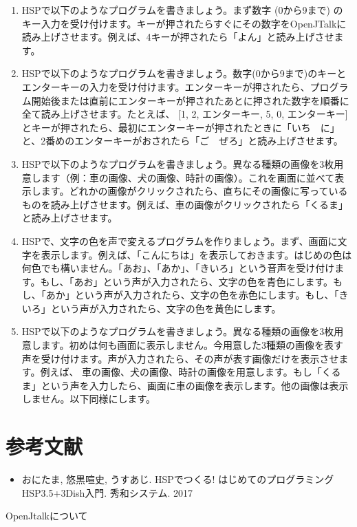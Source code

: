 \documentclass[a4paper,dvipdfmx]{jarticle}
\newcommand\liststyleLxvii{%
\renewcommand\theenumi{\arabic{enumi}}
\renewcommand\theenumii{\arabic{enumii}}
\renewcommand\theenumiii{\arabic{enumiii}}
\renewcommand\theenumiv{\arabic{enumiv}}
\renewcommand\labelenumi{\theenumi.}
\renewcommand\labelenumii{\theenumii.}
\renewcommand\labelenumiii{\theenumiii.}
\renewcommand\labelenumiv{\theenumiv.}
}
\newcommand\liststyleLxviii{%
\renewcommand\labelitemi{{\textbullet}}
\renewcommand\labelitemii{${\circ}$}
\renewcommand\labelitemiii{${\blacksquare}$}
\renewcommand\labelitemiv{{\textbullet}}
}
\begin{document}
\liststyleLxvii
\begin{enumerate}
\item {
HSPで以下のようなプログラムを書きましょう。まず数字
(0から9まで)
のキー入力を受け付けます。キーが押されたらすぐにその数字をOpenJTalkに読み上げさせます。例えば、4キーが押されたら「よん」と読み上げさせます。}
\item {
HSPで以下のようなプログラムを書きましょう。数字(0から9まで)のキーとエンターキーの入力を受け付けます。エンターキーが押されたら、プログラム開始後または直前にエンターキーが押されたあとに押された数字を順番に全て読み上げさせます。たとえば、
[1, 2, エンターキー, 5, 0,
エンターキー]とキーが押されたら、最初にエンターキーが押されたときに「いち　に」と、2番めのエンターキーがおされたら「ご　ぜろ」と読み上げさせます。}
\item {
HSPで以下のようなプログラムを書きましょう。異なる種類の画像を3枚用意します（例：車の画像、犬の画像、時計の画像）。これを画面に並べて表示します。どれかの画像がクリックされたら、直ちにその画像に写っているものを読み上げさせます。例えば、車の画像がクリックされたら「くるま」と読み上げさせます。}
\item {
HSPで、文字の色を声で変えるプログラムを作りましょう。まず、画面に文字を表示します。例えば、「こんにちは」を表示しておきます。はじめの色は何色でも構いません。「あお」、「あか」、「きいろ」という音声を受け付けます。もし、「あお」という声が入力されたら、文字の色を青色にします。もし、「あか」という声が入力されたら、文字の色を赤色にします。もし、「きいろ」という声が入力されたら、文字の色を黄色にします。}
\item {
HSPで以下のようなプログラムを書きましょう。異なる種類の画像を3枚用意します。初めは何も画面に表示しません。今用意した3種類の画像を表す声を受け付けます。声が入力されたら、その声が表す画像だけを表示させます。例えば、
車の画像、犬の画像、時計の画像を用意します。もし「くるま」という声を入力したら、画面に車の画像を表示します。他の画像は表示しません。以下同様にします。}
\end{enumerate}
\section{参考文献}
\liststyleLxviii
\begin{itemize}
\item {
おにたま, 悠黒喧史, うすあじ.
HSPでつくる! はじめてのプログラミング
HSP3.5+3Dish入門. 秀和システム. 2017}
\end{itemize}
{
OpenJtalkについて}
\end{document}
